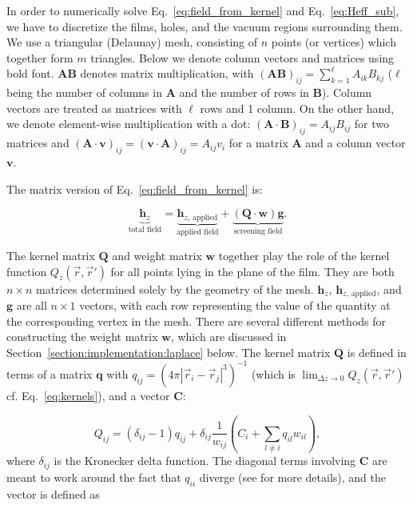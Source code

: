 \documentclass[preprint,12pt]{elsarticle}
\begin{document}
In order to numerically solve Eq.~\ref{eq:field_from_kernel} and Eq.~\ref{eq:Heff_sub}, we have to discretize the films, holes, and the vacuum regions surrounding them. We use a triangular
(Delaunay) mesh, consisting of $n$ points (or vertices)
which together form $m$ triangles. Below we denote column vectors and matrices using bold font. $\mathbf{A}\mathbf{B}$
denotes matrix multiplication, with $(\mathbf{A}\mathbf{B})_{ij}=\sum_{k=1}^\ell A_{ik}B_{kj}$
($\ell$ being the number of columns in $\mathbf{A}$ and the number of rows in $\mathbf{B}$). Column vectors are treated as matrices with $\ell$ rows and 1 column. On the other hand, we denote element-wise multiplication with a dot: $(\mathbf{A}\cdot\mathbf{B})_{ij}=A_{ij}B_{ij}$ for two matrices
and $(\mathbf{A}\cdot\mathbf{v})_{ij}=(\mathbf{v}\cdot\mathbf{A})_{ij}=A_{ij}v_{i}$ for a matrix $\mathbf{A}$ and a column vector $\mathbf{v}$.

The matrix version of Eq.~\ref{eq:field_from_kernel} is:

\begin{equation}
    \label{eq:field_from_kernel_num}
    \underbrace{\mathbf{h}_z}_\text{total field}
    = \underbrace{\mathbf{h}_{z,\,\mathrm{applied}}}_\text{applied field}
    + \underbrace{(\mathbf{Q}\cdot\mathbf{w})\mathbf{g}}_\text{screening field}.
\end{equation}

The kernel matrix $\mathbf{Q}$ and weight matrix $\mathbf{w}$ together play the role of the
kernel function $Q_z(\vec{r},\vec{r}')$ for all points lying in the plane of the film. They are both $n\times n$ matrices determined solely by the geometry of the mesh.
$\mathbf{h}_z$, $\mathbf{h}_{z,\,\mathrm{applied}}$, and $\mathbf{g}$ are all $n\times 1$ vectors, with each row representing the value of the quantity at the
corresponding vertex in the mesh. There are several different methods for constructing the weight matrix $\mathbf{w}$, which are discussed in Section~\ref{section:implementation:laplace} below. The kernel
matrix $\mathbf{Q}$ is defined in terms of a matrix $\mathbf{q}$ with
$q_{ij} = \left(4\pi|\vec{r}_i-\vec{r}_j|^3\right)^{-1}$
(which is $\lim_{\Delta z\to 0}Q_z(\vec{r},\vec{r}')$ cf. Eq.~\ref{eq:kernels}),
and a vector $\mathbf{C}$:

\begin{equation}
    \label{eq:kernel_matrix}
    Q_{ij} = (\delta_{ij}-1)q_{ij}
    + \delta_{ij}\frac{1}{w_{ij}}\left(C_i + \sum_{l\neq i}q_{il}w_{il}\right),
\end{equation}
where $\delta_{ij}$ is the Kronecker delta function. The diagonal terms involving $\mathbf{C}$ are meant to work around the fact that $q_{ii}$ diverge (see \cite{brandt_thin_2005} for more details), and the vector is defined as
\end{document}
